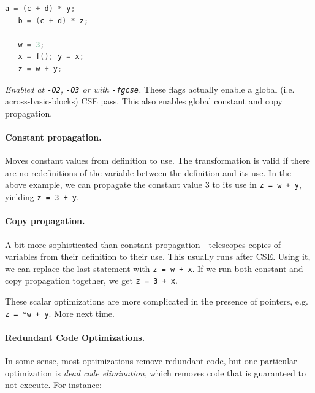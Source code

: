 \documentclass[a4paper]{report}
\begin{document}
\begin{lstlisting}[language=C]
   a = (c + d) * y;
   b = (c + d) * z;

   w = 3;
   x = f(); y = x;
   z = w + y;

\end{lstlisting}


\noindent \emph{Enabled at {\tt -O2}, {\tt -O3} or with {\tt -fgcse}.} 
These flags actually enable a global (i.e. across-basic-blocks) CSE pass.
This also enables global constant and copy propagation.

\paragraph{Constant propagation.} Moves constant values from definition to
use. The transformation is valid if there are no redefinitions of the
variable between the definition and its use. In the above example,
we can propagate the constant value 3 to its use in {\tt z = w + y},
yielding {\tt z = 3 + y}.

\paragraph{Copy propagation.} A bit more sophisticated than constant
propagation---telescopes copies of variables from their definition to
their use. This usually runs after CSE. Using it, we can replace the
last statement with {\tt z = w + x}. If we run both constant and copy
propagation together, we get {\tt z = 3 + x}.

These scalar optimizations are more complicated in the presence
of pointers, e.g. {\tt z = *w + y}. More next time.


\paragraph{Redundant Code Optimizations.} In some sense, most optimizations
remove redundant code, but one particular optimization is \emph{dead code
elimination}, which removes code that is guaranteed to not execute.
For instance:
\end{document}
